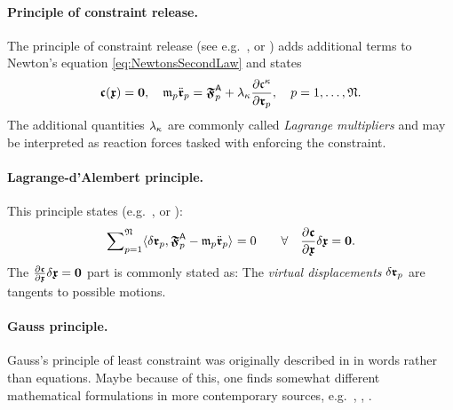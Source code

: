 \paragraph{Principle of constraint release.} 
The principle of constraint release (see e.g.\ \cite[sec.\ III.5]{Lanczos:Variational}, \cite[sec.\ 32]{Hamel:TheoretischeMechanik} or \cite[sec.\ 6.1]{Lurie:AnalyticalMechanics}) adds additional terms to Newton's equation \eqref{eq:NewtonsSecondLaw} and states
\begin{align}\label{eq:ConstraintRelease}
 \particleGeoConstraint(\particleCoord) = \tuple{0},
\quad
 \particleMass{\PidxI} \particlePosdd{\PidxI} = \particleForceImpressed{\PidxI} + \LagrangeMultCoeff{\CidxI} \pdiff[\particleGeoConstraintCoeff{\CidxI}]{\particlePos{\PidxI}},
\quad \PidxI = 1,\ldots,\numParticles.
\end{align}
The additional quantities $\LagrangeMultCoeff{\CidxI}$ are commonly called \textit{Lagrange multipliers} and may be interpreted as reaction forces tasked with enforcing the constraint.

\paragraph{Lagrange-d'Alembert principle.} 
This principle states (e.g.\ \cite[sec.\ IV.2]{Lanczos:Variational}, \cite[sec.\,1.4]{Goldstein:ClassicalMechanics} or \cite[sec.\,6.3]{Lurie:AnalyticalMechanics}):
\begin{align}\label{eq:DAlembertPrinciple}
 \sumParticlesFull \sProd{\delta \particlePos{\PidxI}}{\particleForceImpressed{\PidxI} - \particleMass{\PidxI}\particlePosdd{\PidxI}} = 0 
\qquad \forall \quad \pdiff[\particleGeoConstraint]{\particleCoord} \delta\particleCoord = \tuple{0}.
\end{align}
The $\pdiff[\particleGeoConstraint]{\particleCoord} \delta\particleCoord = \tuple{0}$ part is commonly stated as: The \textit{virtual displacements} $\delta \particlePos{\PidxI}$ are tangents to possible motions.

\paragraph{Gauss principle.}
Gauss's principle of least constraint was originally described in \cite{Gauss:Principle} in words rather than equations.
Maybe because of this, one finds somewhat different mathematical formulations in more contemporary sources, e.g.\ \cite[sec.\ 7]{Paesler:PrinzipeDerMechanik}, \cite[sec.\ IV.8]{Lanczos:Variational}, \cite[sec.\,2.2]{Bremer:ElasticMultibodyDynamics}. %

